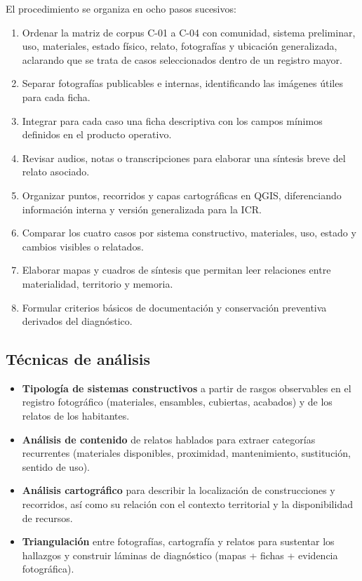 El procedimiento se organiza en ocho pasos sucesivos:

\begin{enumerate}
  \item Ordenar la matriz de corpus C-01 a C-04 con comunidad, sistema preliminar, uso, materiales, estado físico, relato, fotografías y ubicación generalizada, aclarando que se trata de casos seleccionados dentro de un registro mayor.
  \item Separar fotografías publicables e internas, identificando las imágenes útiles para cada ficha.
  \item Integrar para cada caso una ficha descriptiva con los campos mínimos definidos en el producto operativo.
  \item Revisar audios, notas o transcripciones para elaborar una síntesis breve del relato asociado.
  \item Organizar puntos, recorridos y capas cartográficas en QGIS, diferenciando información interna y versión generalizada para la ICR.
  \item Comparar los cuatro casos por sistema constructivo, materiales, uso, estado y cambios visibles o relatados.
  \item Elaborar mapas y cuadros de síntesis que permitan leer relaciones entre materialidad, territorio y memoria.
  \item Formular criterios básicos de documentación y conservación preventiva derivados del diagnóstico.
\end{enumerate}

\subsection{Técnicas de análisis}

\begin{itemize}
	\item \textbf{Tipología de sistemas constructivos} a partir de rasgos observables en el registro fotográfico
	      (materiales, ensambles, cubiertas, acabados) y de los relatos de los habitantes.
	\item \textbf{Análisis de contenido} de relatos hablados para extraer categorías recurrentes
	      (materiales disponibles, proximidad, mantenimiento, sustitución, sentido de uso).
	\item \textbf{Análisis cartográfico} para describir la localización de construcciones y recorridos, así como su relación
	      con el contexto territorial y la disponibilidad de recursos.
	\item \textbf{Triangulación} entre fotografías, cartografía y relatos para sustentar los hallazgos y construir
	      láminas de diagnóstico (mapas + fichas + evidencia fotográfica).
\end{itemize}

